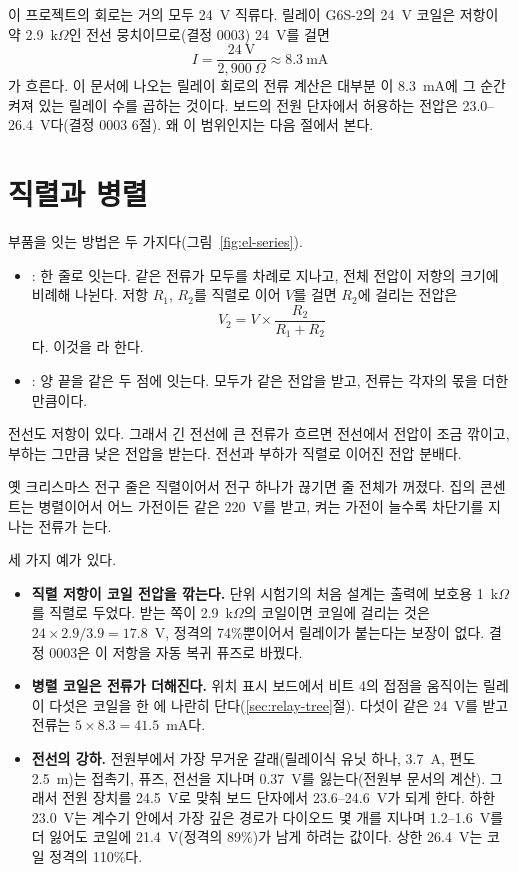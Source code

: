 \Ours 이 프로젝트의 회로는 거의 모두 24~V 직류다. 릴레이 G6S-2의 24~V 코일은 저항이 약 2.9~k$\Omega$인 전선
뭉치이므로(결정 0003) 24~V를 걸면
\[
  I = \frac{24\ \text{V}}{2{,}900\ \Omega} \approx 8.3\ \text{mA}
\]
가 흐른다. 이 문서에 나오는 릴레이 회로의 전류 계산은 대부분 이 8.3~mA에 그 순간 켜져 있는 릴레이 수를 곱하는 것이다. 보드의 전원
단자에서 허용하는 전압은 23.0--26.4~V다(결정 0003 6절). 왜 이 범위인지는 다음 절에서 본다.

\section{직렬과 병렬}\label{sec:el-series}

\Why 부품을 잇는 방법은 두 가지다(그림~\ref{fig:el-series}).
\begin{itemize}
\item {}: 한 줄로 잇는다. 같은 전류가 모두를 차례로 지나고, 전체 전압이 저항의 크기에 비례해
나뉜다. 저항 $R_1$, $R_2$를 직렬로 이어 $V$를 걸면 $R_2$에 걸리는 전압은
\[
  V_2 = V \times \frac{R_2}{R_1 + R_2}
\]
다. 이것을 라 한다.
\item {}: 양 끝을 같은 두 점에 잇는다. 모두가 같은 전압을 받고, 전류는 각자의 몫을 더한
만큼이다.
\end{itemize}
전선도 저항이 있다. 그래서 긴 전선에 큰 전류가 흐르면 전선에서 전압이 조금 깎이고, 부하는 그만큼 낮은 전압을
받는다. 전선과 부하가 직렬로 이어진 전압 분배다.

\General 옛 크리스마스 전구 줄은 직렬이어서 전구 하나가 끊기면 줄 전체가 꺼졌다. 집의 콘센트는 병렬이어서 어느
가전이든 같은 220~V를 받고, 켜는 가전이 늘수록 차단기를 지나는 전류가 는다.

\Ours 세 가지 예가 있다.
\begin{itemize}
\item \textbf{직렬 저항이 코일 전압을 깎는다.} 단위 시험기의 처음 설계는  출력에 보호용 1~k$\Omega$를
직렬로 두었다. 받는 쪽이 2.9~k$\Omega$의 코일이면 코일에 걸리는 것은 $24 \times 2.9/3.9 = 17.8$~V, 정격의
74\%뿐이어서 릴레이가 붙는다는 보장이 없다. 결정 0003은 이 저항을 자동 복귀 퓨즈로 바꿨다.
\item \textbf{병렬 코일은 전류가 더해진다.} 위치 표시 보드에서 비트 4의 접점을 움직이는 릴레이 다섯은 코일을 한
에 나란히 단다(\ref{sec:relay-tree}절). 다섯이 같은 24~V를 받고 전류는
$5 \times 8.3 = 41.5$~mA다.
\item \textbf{전선의 강하.} 전원부에서 가장 무거운 갈래(릴레이식 유닛 하나, 3.7~A, 편도 2.5~m)는 접촉기, 퓨즈,
전선을 지나며 0.37~V를 잃는다(전원부 문서의 계산). 그래서 전원 장치를 24.5~V로 맞춰 보드 단자에서 23.6--24.6~V가
되게 한다. 하한 23.0~V는 계수기 안에서 가장 깊은 경로가 다이오드 몇 개를 지나며 1.2--1.6~V를 더 잃어도
코일에 21.4~V(정격의 89\%)가 남게 하려는 값이다. 상한 26.4~V는 코일 정격의 110\%다.
\end{itemize}

